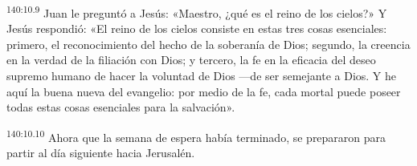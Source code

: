 \par
\textsuperscript{140:10.9} Juan le preguntó a Jesús: «Maestro, ¿qué es el reino de los cielos?» Y Jesús respondió: «El reino de los cielos consiste en estas tres cosas esenciales: primero, el reconocimiento del hecho de la soberanía de Dios; segundo, la creencia en la verdad de la filiación con Dios; y tercero, la fe en la eficacia del deseo supremo humano de hacer la voluntad de Dios ---de ser semejante a Dios. Y he aquí la buena nueva del evangelio: por medio de la fe, cada mortal puede poseer todas estas cosas esenciales para la salvación».

\par
\textsuperscript{140:10.10} Ahora que la semana de espera había terminado, se prepararon para partir al día siguiente hacia Jerusalén.